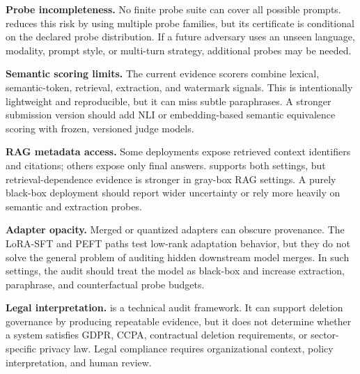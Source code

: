 \textbf{Probe incompleteness.}
No finite probe suite can cover all possible prompts. \method{} reduces this risk by using multiple probe families, but its certificate is conditional on the declared probe distribution. If a future adversary uses an unseen language, modality, prompt style, or multi-turn strategy, additional probes may be needed.

\textbf{Semantic scoring limits.}
The current evidence scorers combine lexical, semantic-token, retrieval, extraction, and watermark signals. This is intentionally lightweight and reproducible, but it can miss subtle paraphrases. A stronger submission version should add NLI or embedding-based semantic equivalence scoring with frozen, versioned judge models.

\textbf{RAG metadata access.}
Some deployments expose retrieved context identifiers and citations; others expose only final answers. \method{} supports both settings, but retrieval-dependence evidence is stronger in gray-box RAG settings. A purely black-box deployment should report wider uncertainty or rely more heavily on semantic and extraction probes.

\textbf{Adapter opacity.}
Merged or quantized adapters can obscure provenance. The LoRA-SFT and PEFT paths test low-rank adaptation behavior, but they do not solve the general problem of auditing hidden downstream model merges. In such settings, the audit should treat the model as black-box and increase extraction, paraphrase, and counterfactual probe budgets.

\textbf{Legal interpretation.}
\method{} is a technical audit framework. It can support deletion governance by producing repeatable evidence, but it does not determine whether a system satisfies GDPR, CCPA, contractual deletion requirements, or sector-specific privacy law. Legal compliance requires organizational context, policy interpretation, and human review.
